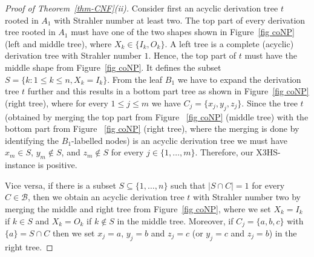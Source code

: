 \documentclass[a4paper,UKenglish,cleveref, autoref, thm-restate, numberwithinsect]{lipics-v2021}
\begin{document}
\begin{proof}[Proof of Theorem~\ref{thm-CNF}(ii)]
 Consider first an acyclic derivation tree $t$ rooted in $A_1$ with Strahler number at least two. The top part of every derivation tree rooted
 in $A_1$ must have one of the two shapes shown in Figure~\ref{fig coNP} (left and middle tree), where
 $X_k \in \{ I_k, O_k \}$.
 A left tree is a complete (acyclic) derivation tree with Strahler number $1$. Hence, the top part of $t$ must have the middle shape from 
  Figure~\ref{fig coNP}. It defines the
subset $S = \{ k : 1 \leq k \leq n, X_k = I_k \}$. 
 From the leaf $B_1$ we have to expand the derivation tree $t$ further and this results in a bottom part tree as shown in Figure~\ref{fig coNP} (right tree), where for every $1 \le j \le m$ we have $C_j = \{ x_j, y_j, z_j\}$.
Since the tree $t$ (obtained by merging the top part from Figure ~\ref{fig coNP} (middle tree) with the 
bottom part from Figure ~\ref{fig coNP} (right tree), where the merging is done by identifying the $B_1$-labelled nodes)
 is an acyclic derivation tree we must have $x_m \in S$, $y_m \notin S$, and $z_m \notin S$ for every $j \in \{1, \ldots, m\}$.
 Therefore, our X3HS-instance is positive. 
 
 Vice versa, if there is a subset $S \subseteq \{1,\ldots,n\}$ such that $|S \cap C|=1$ for every $C \in \mathcal{B}$, then we obtain an acyclic 
 derivation tree $t$ with Strahler number two by merging the middle and right tree from Figure~\ref{fig coNP}, where we set
 $X_k = I_k$ if $k \in S$ and $X_k = O_k$ if $k \notin S$ in the middle tree. 
 Moreover, if $C_j = \{a,b,c\}$ with $\{a\} = S \cap C$ then we set
 $x_j = a$, $y_j = b$ and $z_j = c$ (or $y_j = c$ and $z_j = b$) in the right tree.
 \end{proof}
 
\end{document}
